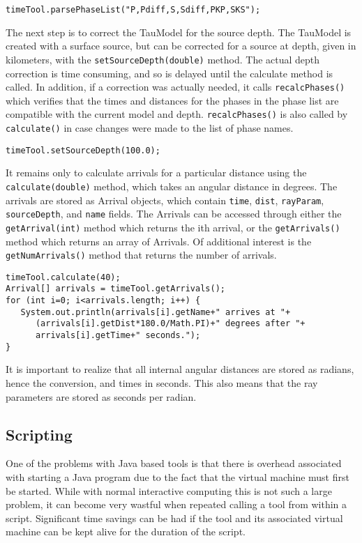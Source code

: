 \texttt{timeTool.parsePhaseList("P,Pdiff,S,Sdiff,PKP,SKS");}

The next step is to correct the TauModel for the source depth.
The TauModel is created with a surface source, but can be corrected for
a source at depth, given in kilometers, with the \texttt{setSourceDepth(double)}
method. The actual depth correction is time consuming, and so is delayed until the calculate method is called. In addition,
if a correction was actually needed, it
calls \texttt{recalcPhases()} which verifies that the times and distances for
the phases in the phase list are compatible with the current model and depth.
\texttt{recalcPhases()} is also called
by \texttt{calculate()} in case changes were made to the list of phase names.

\texttt{timeTool.setSourceDepth(100.0);}

It remains only to calculate arrivals for a particular distance using the
\texttt{calculate(double)} method, which takes an angular distance in degrees.
The arrivals are stored as Arrival objects, which contain \texttt{time},
\texttt{dist}, \texttt{rayParam}, \texttt{sourceDepth}, and \texttt{name}
fields. The Arrivals can be accessed through either the
\texttt{getArrival(int)} method which returns the ith arrival, or
the \texttt{getArrivals()} method which returns an array of Arrivals.
Of additional interest is the \texttt{getNumArrivals()} method that returns
the number of arrivals.

\begin{verbatim}
timeTool.calculate(40);
Arrival[] arrivals = timeTool.getArrivals();
for (int i=0; i<arrivals.length; i++) {
   System.out.println(arrivals[i].getName+" arrives at "+
      (arrivals[i].getDist*180.0/Math.PI)+" degrees after "+
      arrivals[i].getTime+" seconds.");
}
\end{verbatim}

It is important to realize that all internal angular distances are
stored as radians, hence the conversion, and times in seconds.
This also means that the
ray parameters are stored as seconds per radian.



\subsection{Scripting}

One of the problems with Java based tools is that there is overhead associated
with starting a Java program due to the fact that the virtual machine must
first be started. While with normal interactive computing this is not such
a large problem, it can become very wastful when repeated calling a tool
from within a script. Significant time savings can be had if the tool
and its associated virtual machine can be kept alive for the duration
of the script.

